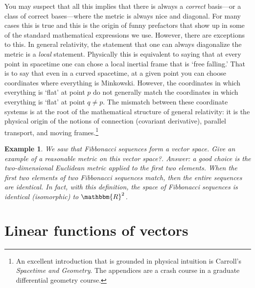 \documentclass[
  11pt,
	colorful,
	raggedright,
]{tufte-style-thesis-flip}
\newtheorem{example}{Example}[section]
\begin{document}
You may suspect that all this implies that there is always a \emph{correct} basis---or a class of correct bases---where the metric is always nice and diagonal. For many cases this is true and this is the origin of funny prefactors that show up in some of the standard mathematical expressions we use. However, there are exceptions to this. In general relativity, the statement that one can always diagonalize the metric is a \emph{local} statement. Physically this is equivalent to saying that at every point in spacetime one can chose a local inertial frame that is `free falling.' That is to say that even in a curved spacetime, at a given point you can choose coordinates where everything is Minkowski. However, the coordinates in which everything is `flat' at point $p$ do not generally match the coordinates in which everything is `flat' at point $q\neq p$. The mismatch between these coordinate systems is at the root of the mathematical structure of general relativity: it is the physical origin of the notions of connection (covariant derivative), parallel transport, and moving frames.\footnote{An excellent introduction that is grounded in physical intuition is Carroll's \emph{Spacetime and Geometry}. The appendices are a crash course in a graduate differential geometry course.}


\begin{example}
We saw that Fibbonacci sequences form a vector space. Give an example of a reasonable metric on this vector space?. Answer: a good choice is the two-dimensional Euclidean metric applied to the first two elements. When the first two elements of two Fibbonacci sequences match, then the entire sequences are identical. In fact, with this definition, the space of Fibbonacci sequences is identical (isomorphic) to $\mathbbm{R}^2$.  
\end{example}

\section{Linear functions of vectors}
\end{document}
